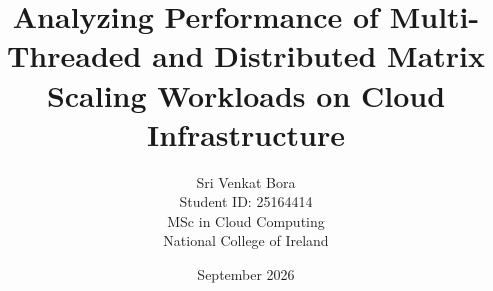 \documentclass[12pt,a4paper]{report}
\begin{document}
\title{Analyzing Performance of Multi-Threaded and Distributed Matrix Scaling Workloads on Cloud Infrastructure}
\author{Sri Venkat Bora\\Student ID: 25164414\\MSc in Cloud Computing\\National College of Ireland}
\date{September 2026}

\maketitle

\begin{abstract}

\end{abstract}

\tableofcontents











\end{document}
